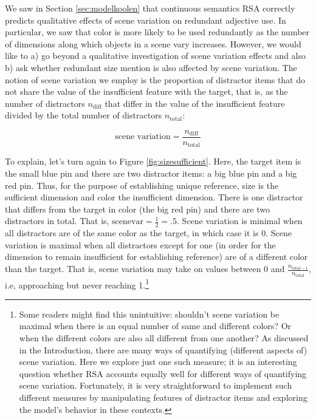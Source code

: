 \documentclass[11pt]{article}
\newcommand{\figref}[1]{Figure \ref{#1}}
\newcommand{\sectionref}[1]{Section \ref{#1}}
\begin{document}
We saw in \sectionref{sec:modelkoolen} that continuous semantics RSA correctly predicts qualitative effects of scene variation on redundant adjective use. In particular, we saw that color is more likely to be used redundantly as the number of dimensions along which objects in a scene vary increases. However, we would like to a) go beyond a qualitative investigation of scene variation effects and also b) ask whether redundant size mention is also affected by scene variation. The notion of scene variation we employ is the proportion of distractor items that do not share the value of the insufficient feature with the target, that is, as the number of distractors $n_{\textrm{diff}}$ that differ in the value of the insufficient feature divided by the total number of distractors $n_{\textrm{total}}$:

\begin{equation*}
	\textrm{scene variation} = \frac{n_{\textrm{diff}}}{n_{\textrm{total}}}
\end{equation*}

To explain, let's turn again to \figref{fig:sizesufficient}. Here, the target item is the small blue pin and there are two distractor items: a big blue pin and a big red pin. Thus, for the purpose of establishing unique reference, size is the sufficient dimension and color the insufficient dimension. There is one distractor that differs from the target in color (the big red pin) and there are two distractors in total. That is, $\textrm{scenevar} = \frac{1}{2} = .5$. Scene variation is minimal when all distractors are of the same color as the target, in which case it is 0. Scene variation is maximal when all distractors except for one (in order for the dimension to remain insufficient for establishing reference) are of a different color than the target. That is, scene variation may take on values between 0 and $\frac{n_{\textrm{total} - 1}}{n_{\textrm{total}}}$, i.e, approaching but never reaching 1.\footnote{Some readers might find this unintuitive: shouldn't scene variation be maximal when there is an equal number of same and different colors? Or when the different colors are also all different from one another? As discussed in the Introduction, there are many ways of quantifying (different aspects of) scene variation. Here we explore just one such measure; it is an interesting question whether RSA accounts equally well for different ways of quantifying scene variation. Fortunately, it is very straightforward to implement such different measures by manipulating features of distractor items and exploring the model's behavior in these contexts.}
\end{document}
